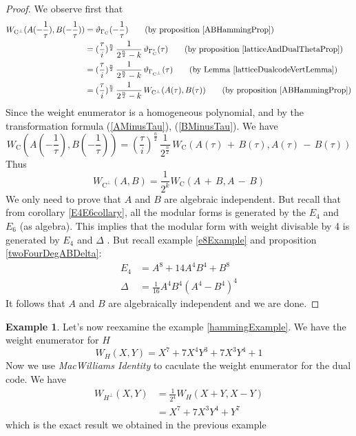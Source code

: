 \documentclass[12pt]{article}
\theoremstyle{definition}
\newtheorem{example}[theorem]{Example}
\numberwithin{equation}{theorem}
\numberwithin{figure}{theorem}
\newcommand{\simpleCodes}{\ensuremath{\mathrm{C}}}
\newcommand{\buildVertical}[1]{\ensuremath{#1^{\bot}}}
\newcommand{\buildLattice}[1]{\ensuremath{\Gamma_{#1}}}
\newcommand{\weightEnumerator}[3]{\ensuremath{W_{#1}(#2,#3)}}
\newcommand{\thetaFunction}[1]{\ensuremath{\vartheta_{#1}}}
\newcommand{\imaginary}{\ensuremath{i}}
\begin{document}
\begin{proof}
We observe first that
\begin{align*}
	\weightEnumerator{\buildVertical{\simpleCodes}}{A(-\frac{1}{\tau})}{B(-\frac{1}{\tau})} &= \thetaFunction{\buildLattice{\simpleCodes}}(-\frac{1}{\tau}) \tag{by proposition \ref{ABHammingProp}} \\ %
	&= (\frac{\tau}{\imaginary})^{\frac{n}{2}} \, \frac{1}{2^{\frac{n}{2}} - k} \,\thetaFunction{\buildLattice{\simpleCodes}^*}(\tau) \tag{by proposition \ref{latticeAndDualThetaProp}}\\  %
		&= (\frac{\tau}{\imaginary})^{\frac{n}{2}} \, \frac{1}{2^{\frac{n}{2}} - k} \,\thetaFunction{\buildLattice{\buildVertical{\simpleCodes}}}(\tau)\tag{by Lemma \ref{latticeDualcodeVertLemma}}\\ %
		&= (\frac{\tau}{\imaginary})^{\frac{n}{2}} \, \frac{1}{2^{\frac{n}{2}} - k} \,\weightEnumerator{\buildVertical{\simpleCodes}}{A(\tau)}{B(\tau)} \tag{by proposition \ref{ABHammingProp}}
\end{align*}
Since the weight enumerator is a homogeneous polynomial, and by the transformation formula (\ref{AMinusTau}), (\ref{BMinusTau}). We have
\[
	\weightEnumerator{\simpleCodes}{A(-\frac{1}{\tau})}{B(-\frac{1}{\tau})} = (\frac{\tau}{\imaginary})^{\frac{n}{2}} \, \frac{1}{2^{\frac{n}{2}}} \, \weightEnumerator{\simpleCodes}{A(\tau)\, + \,B(\tau)}{A(\tau) \,- \,B(\tau)}
\]
Thus
\[
	\weightEnumerator{\buildVertical{\simpleCodes}}{A}{B} = \frac{1}{2^k} \weightEnumerator{\simpleCodes}{A \,+\, B}{A \, - \, B}
\]
We only need to prove that $A$ and $B$ are algebraic independent. But recall that from corollary \ref{E4E6collary}, all the modular forms is generated by the $E_4$ and $E_6$ (as algebra). This implies that the modular form with weight divisable by 4 is generated by $E_4$ and $\Delta$ . But recall example \ref{e8Example} and proposition \ref{twoFourDegABDelta}:
\begin{align*}
	E_4 &= A^8 + 14A^4B^4 + B^8\\
	\Delta &= \frac{1}{16}A^4B^4(A^4 - B^4)^4
\end{align*}
It follows that $A$ and $B$ are algebraically independent and we are done.
\end{proof}
\begin{example}\label{macWilliamsHamingExample}
Let's now reexamine the example \ref{hammingExample}.
We have the weight enumerator for $H$
\[
	\weightEnumerator{H}{X}{Y} = X^7 + 7X^4Y^3 + 7X^3Y^4 + 1
\]
Now we use \emph{MacWilliams Identity} to caculate the weight enumerator for the dual code. We have
\begin{align*}
	\weightEnumerator{\buildVertical{H}}{X}{Y} 
	&= \frac{1}{2^4}\weightEnumerator{H}{X+Y}{X-Y}\\
	&= X^7 + 7X^3Y^4 + Y^7
\end{align*}
which is the exact result we obtained in the previous example
\end{example}
\end{document}
